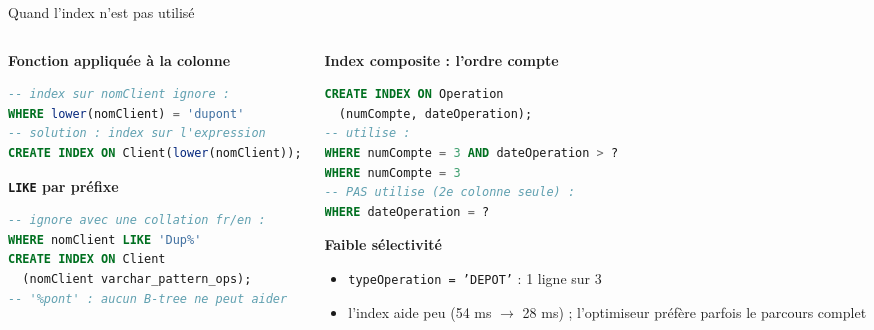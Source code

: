 \documentclass[aspectratio=169,10pt]{beamer}
\begin{document}
\begin{frame}[fragile]{Quand l'index n'est pas utilis\'e}
  \begin{columns}[T]
    \begin{column}{0.5\textwidth}
      \textbf{Fonction appliqu\'ee \`a la colonne}
\begin{lstlisting}[language=SQL]
-- index sur nomClient ignore :
WHERE lower(nomClient) = 'dupont'
-- solution : index sur l'expression
CREATE INDEX ON Client(lower(nomClient));
\end{lstlisting}
      \textbf{\texttt{LIKE} par pr\'efixe}
\begin{lstlisting}[language=SQL]
-- ignore avec une collation fr/en :
WHERE nomClient LIKE 'Dup%'
CREATE INDEX ON Client
  (nomClient varchar_pattern_ops);
-- '%pont' : aucun B-tree ne peut aider
\end{lstlisting}
    \end{column}
    \begin{column}{0.47\textwidth}
      \textbf{Index composite : l'ordre compte}
\begin{lstlisting}[language=SQL]
CREATE INDEX ON Operation
  (numCompte, dateOperation);
-- utilise :
WHERE numCompte = 3 AND dateOperation > ?
WHERE numCompte = 3
-- PAS utilise (2e colonne seule) :
WHERE dateOperation = ?
\end{lstlisting}
      \textbf{Faible s\'electivit\'e}
      \begin{itemize}
        \item \texttt{typeOperation = 'DEPOT'} : 1 ligne sur 3
        \item l'index aide peu (54 ms $\to$ 28 ms) ; l'optimiseur pr\'ef\`ere parfois le parcours complet
      \end{itemize}
    \end{column}
  \end{columns}
\end{frame}
\end{document}
